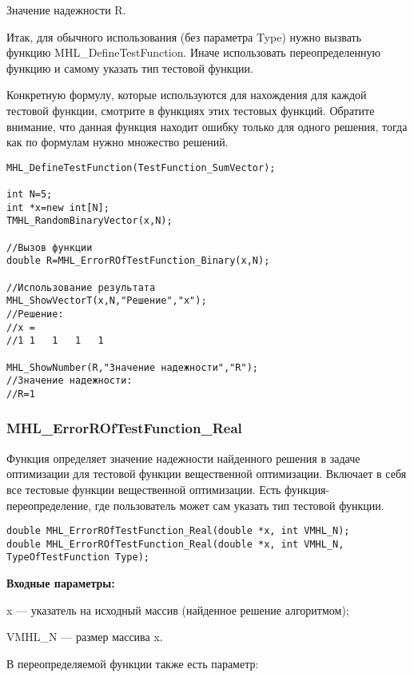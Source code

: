 \documentclass[a4paper,12pt]{article}
\begin{document}
Значение надежности R.

Итак, для обычного использования (без параметра Type) нужно вызвать функцию MHL\_DefineTestFunction. Иначе использовать переопределенную функцию и самому указать тип тестовой функции.

Конкретную формулу, которые используются для нахождения для каждой тестовой функции, смотрите в функциях этих тестовых функций. Обратите внимание, что данная функция находит ошибку только для одного решения, тогда как по формулам нужно множество решений.


\begin{lstlisting}[label=code_use_MHL_ErrorROfTestFunction_Binary,caption=Пример использования]
MHL_DefineTestFunction(TestFunction_SumVector);

int N=5;
int *x=new int[N];
TMHL_RandomBinaryVector(x,N);

//Вызов функции
double R=MHL_ErrorROfTestFunction_Binary(x,N);

//Использование результата
MHL_ShowVectorT(x,N,"Решение","x");
//Решение:
//x =
//1	1	1	1	1

MHL_ShowNumber(R,"Значение надежности","R");
//Значение надежности:
//R=1
\end{lstlisting}

\subsubsection{MHL\_ErrorROfTestFunction\_Real}\label{MHL_ErrorROfTestFunction_Real}

Функция определяет значение надежности найденного решения в задаче оптимизации для тестовой функции вещественной оптимизации. Включает в себя все тестовые функции  вещественной оптимизации. Есть функция-переопределение, где пользователь может сам указать тип тестовой функции.


\begin{lstlisting}[label=code_syntax_MHL_ErrorROfTestFunction_Real,caption=Синтаксис]
double MHL_ErrorROfTestFunction_Real(double *x, int VMHL_N);
double MHL_ErrorROfTestFunction_Real(double *x, int VMHL_N, TypeOfTestFunction Type);
\end{lstlisting}

\textbf{Входные параметры:}

x --- указатель на исходный массив (найденное решение алгоритмом);

VMHL\_N --- размер массива x.

В переопределяемой функции также есть параметр:
  
\end{document}
